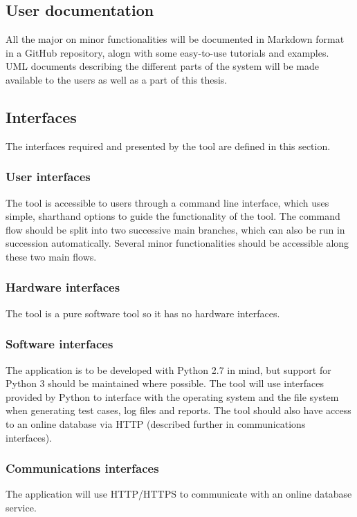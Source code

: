 \subsection{User documentation}
All the major on minor functionalities will be documented in Markdown format in a GitHub repository, alogn with some easy-to-use tutorials and examples. UML documents describing the different parts of the system will be made available to the users as well as a part of this thesis.  

\subsection{Interfaces}
The interfaces required and presented by the tool are defined in this section. 

\subsubsection{User interfaces}
The tool is accessible to users through a command line interface, which uses simple, sharthand options to guide the functionality of the tool. The command flow should be split into two successive main branches, which can also be run in succession automatically. Several minor functionalities should be accessible along these two main flows.

\subsubsection{Hardware interfaces}
The tool is a pure software tool so it has no hardware interfaces. 

\subsubsection{Software interfaces}
The application is to be developed with Python 2.7 in mind, but support for Python 3 should be maintained where possible. The tool will use interfaces provided by Python to interface with the operating system and the file system when generating test cases, log files and reports. The tool should also have access to an online database via HTTP (described further in communications interfaces).

\subsubsection{Communications interfaces}
The application will use HTTP/HTTPS to communicate with an online database service.

